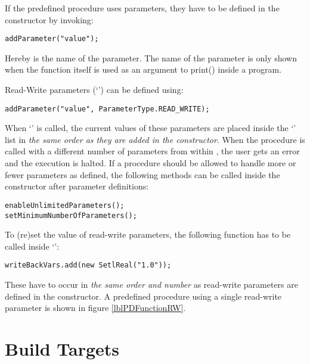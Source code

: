 
If the predefined procedure uses parameters, they have to be defined in the constructor by invoking:
\begin{lstlisting}[frame=none,numbers=none]
addParameter("value");
\end{lstlisting}

Hereby  is the name of the parameter. The name of the parameter is only shown when the function itself is used as an argument to print() inside a \SetlX{} program.

Read-Write parameters (`') can be defined using:
\begin{lstlisting}[frame=none,numbers=none]
addParameter("value", ParameterType.READ_WRITE);
\end{lstlisting}

When `' is called, the current values of these parameters are placed inside the `' list in \emph{the same order as they are added in the constructor}. When the procedure is called with a different number of parameters from within \SetlX{}, the user gets an error and the execution is halted. If a procedure should be allowed to handle more or fewer parameters as defined, the following methods can be called inside the constructor after parameter definitions:
\begin{lstlisting}[frame=none,numbers=none]
enableUnlimitedParameters();
setMinimumNumberOfParameters();
\end{lstlisting}

To (re)set the value of read-write parameters, the following function has to be called inside `':
\begin{lstlisting}[frame=none,numbers=none]
writeBackVars.add(new SetlReal("1.0"));
\end{lstlisting}

These have to occur in \emph{the same order and number} as read-write parameters are defined in the constructor. A predefined procedure using a single read-write parameter is shown in figure \ref{lblPDFunctionRW}.


\section{Build Targets}

